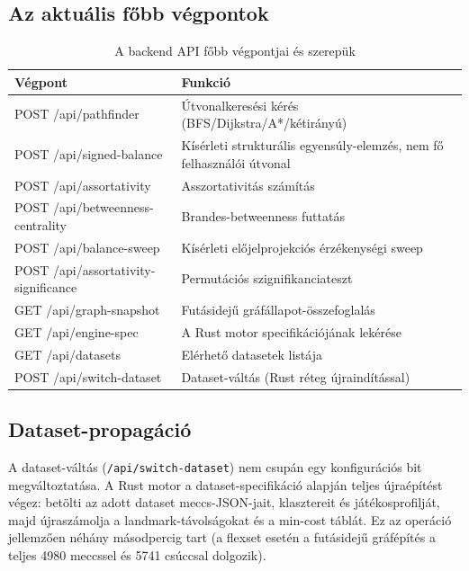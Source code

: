 \subsection{Az aktuális főbb végpontok}

\begin{table}[H]
\centering
\caption{A backend API főbb végpontjai és szerepük}
\small
\begin{tabularx}{\textwidth}{>{\ttfamily\raggedright\arraybackslash}p{5.5cm} >{\raggedright\arraybackslash}X}
\toprule
\textbf{Végpont} & \textbf{Funkció} \\
\midrule
POST /api/pathfinder & Útvonalkeresési kérés (BFS/Dijkstra/A*/kétirányú) \\
POST /api/signed-balance & Kísérleti strukturális egyensúly-elemzés, nem fő felhasználói útvonal \\
POST /api/assortativity & Asszortativitás számítás \\
POST /api/betweenness-centrality & Brandes-betweenness futtatás \\
POST /api/balance-sweep & Kísérleti előjelprojekciós érzékenységi sweep \\
POST /api/assortativity-significance & Permutációs szignifikanciateszt \\
GET /api/graph-snapshot & Futásidejű gráfállapot-összefoglalás \\
GET /api/engine-spec & A Rust motor specifikációjának lekérése \\
GET /api/datasets & Elérhető datasetek listája \\
POST /api/switch-dataset & Dataset-váltás (Rust réteg újraindítással) \\
\bottomrule
\end{tabularx}
\normalsize
\end{table}

\subsection{Dataset-propagáció}

A dataset-váltás (\texttt{/api/switch-dataset}) nem csupán egy konfigurációs bit megváltoztatása. A Rust motor a dataset-specifikáció alapján teljes újraépítést végez: betölti az adott dataset meccs-JSON-jait, klasztereit és játékosprofilját, majd újraszámolja a landmark-távolságokat és a min-cost táblát. Ez az operáció jellemzően néhány másodpercig tart (a flexset esetén a futásidejű gráfépítés a teljes 4980 meccssel és 5741 csúccsal dolgozik).

